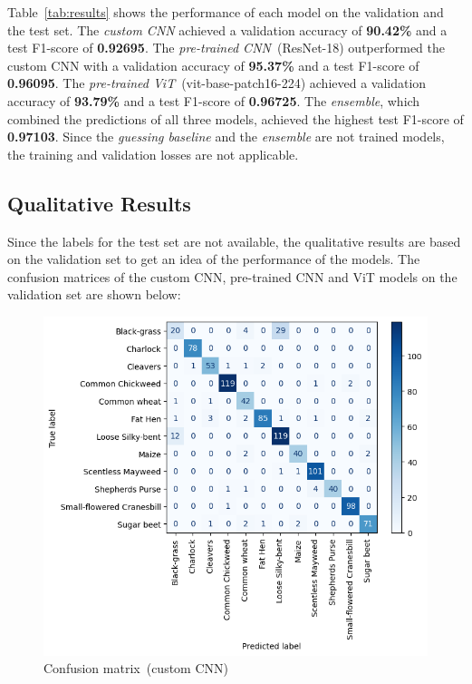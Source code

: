 Table~\ref{tab:results} shows the performance of each model on the validation and the test set. The \textit{custom CNN} achieved a validation accuracy of \textbf{90.42\%} and a test F1-score of \textbf{0.92695}. The \textit{pre-trained CNN}~(ResNet-18) outperformed the custom CNN with a validation accuracy of \textbf{95.37\%} and a test F1-score of \textbf{0.96095}. The \textit{pre-trained ViT}~(vit-base-patch16-224) achieved a validation accuracy of \textbf{93.79\%} and a test F1-score of \textbf{0.96725}. The \textit{ensemble}, which combined the predictions of all three models, achieved the highest test F1-score of \textbf{0.97103}. Since the \textit{guessing baseline} and the \textit{ensemble} are not trained models, the training and validation losses are not applicable.

\subsection{Qualitative Results}

Since the labels for the test set are not available, the qualitative results are based on the validation set to get an idea of the performance of the models. The confusion matrices of the custom CNN, pre-trained CNN and ViT models on the validation set are shown below:

\begin{figure}[htbp]
    \centerline{\includegraphics[width=0.9\linewidth]{../../resources/custom_cnn/confusion.png}}
    \caption{Confusion matrix~(custom CNN)}
    \label{fig:confusion-matrix-custom-cnn}
\end{figure}

